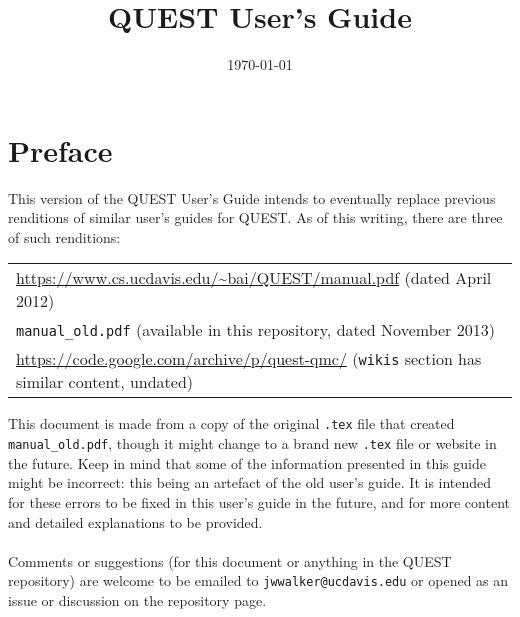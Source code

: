 \documentclass[12pt]{article}
\title{QUEST User's Guide}
\date{\today}
\begin{document}
\maketitle
\newpage
\tableofcontents
\thispagestyle{empty}
\newpage







\section{Preface}\label{sec preface}
    This version of the QUEST User's Guide intends to eventually replace previous renditions of similar user's guides for QUEST.
    As of this writing, there are three of such renditions:
    \begin{center}
    \begin{tabular}{l}
        \url{https://www.cs.ucdavis.edu/~bai/QUEST/manual.pdf} (dated April 2012) \\
        \texttt{manual\_old.pdf} (available in this repository, dated November 2013) \\
        \url{https://code.google.com/archive/p/quest-qmc/} (\texttt{wikis} section has similar content, undated)
    \end{tabular}
    \end{center}
    This document is made from a copy of the original \texttt{.tex} file that created \texttt{manual\_old.pdf}, though it might change to a brand new \texttt{.tex} file or website in the future.
    Keep in mind that some of the information presented in this guide might be incorrect: this being an artefact of the old user's guide.
    It is intended for these errors to be fixed in this user's guide in the future, and for more content and detailed explanations to be provided. \\
    \\
    Comments or suggestions (for this document or anything in the QUEST repository) are welcome to be emailed to \texttt{jwwalker@ucdavis.edu} or opened as an issue or discussion on the repository page.
\end{document}
